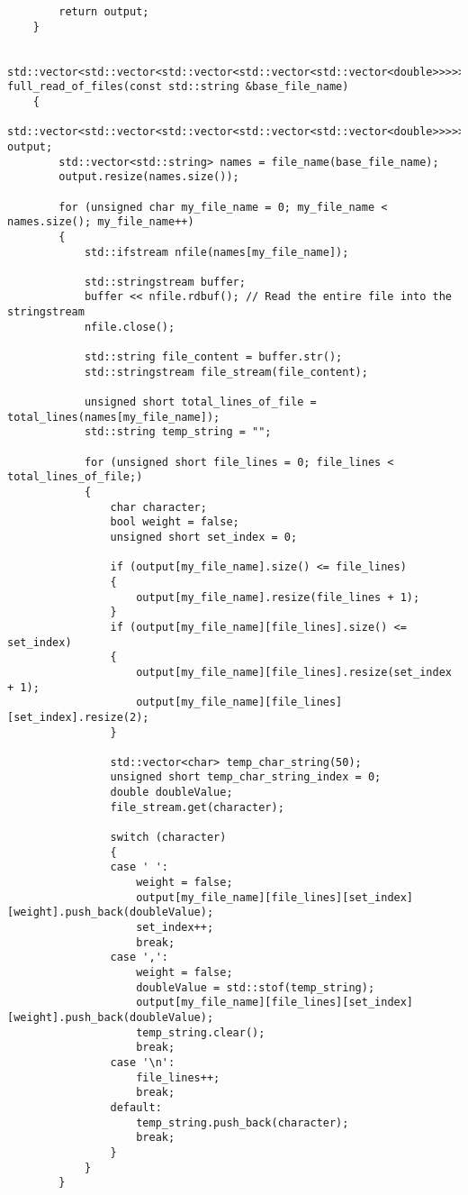 \begin{verbatim}
        return output;
    }

    std::vector<std::vector<std::vector<std::vector<std::vector<double>>>>> full_read_of_files(const std::string &base_file_name)
    {
        std::vector<std::vector<std::vector<std::vector<std::vector<double>>>>> output;
        std::vector<std::string> names = file_name(base_file_name);
        output.resize(names.size());

        for (unsigned char my_file_name = 0; my_file_name < names.size(); my_file_name++)
        {
            std::ifstream nfile(names[my_file_name]);

            std::stringstream buffer;
            buffer << nfile.rdbuf(); // Read the entire file into the stringstream
            nfile.close();
        
            std::string file_content = buffer.str();
            std::stringstream file_stream(file_content);

            unsigned short total_lines_of_file = total_lines(names[my_file_name]);
            std::string temp_string = "";

            for (unsigned short file_lines = 0; file_lines < total_lines_of_file;)
            {
                char character;
                bool weight = false;
                unsigned short set_index = 0;

                if (output[my_file_name].size() <= file_lines)
                {
                    output[my_file_name].resize(file_lines + 1);
                }
                if (output[my_file_name][file_lines].size() <= set_index)
                {
                    output[my_file_name][file_lines].resize(set_index + 1);
                    output[my_file_name][file_lines][set_index].resize(2);
                }

                std::vector<char> temp_char_string(50);
                unsigned short temp_char_string_index = 0;
                double doubleValue;
                file_stream.get(character);

                switch (character)
                {
                case ' ':
                    weight = false;
                    output[my_file_name][file_lines][set_index][weight].push_back(doubleValue);
                    set_index++;
                    break;
                case ',':
                    weight = false;
                    doubleValue = std::stof(temp_string);
                    output[my_file_name][file_lines][set_index][weight].push_back(doubleValue);
                    temp_string.clear();
                    break;
                case '\n':
                    file_lines++;
                    break;
                default:
                    temp_string.push_back(character);
                    break;
                }
            }
        }


\end{verbatim}

